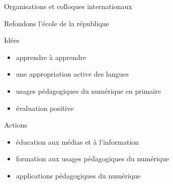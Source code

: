 \begin{frame}{Organisations et colloques internationaux}
\end{frame}

\begin{frame}{Refondons l'école de la république}

\pause
\begin{block}{Idées}
  \begin{itemize}
    \item apprendre à apprendre
    \item une appropriation active des langues
    \item usages pédagogiques du numérique en primaire
    \item évaluation positive
  \end{itemize}
\end{block}
\pause

\begin{block}{Actions}
\begin{itemize}
  \item éducation aux médias et à l’information 
  \item formation aux usages pédagogiques du numérique
  \item applications pédagogiques du numérique
\end{itemize} 
\end{block}

\end{frame}


